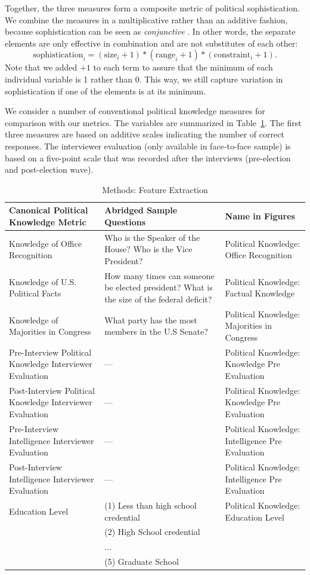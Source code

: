 \documentclass[12pt]{article}
\begin{document}
Together, the three measures form a composite metric of political sophistication. We combine the measures in a multiplicative rather than an additive fashion, because sophistication can be seen as \textit{conjunctive} \citep[see][]{luskin1987measuring}. In other words, the separate elements are only effective in combination and are not substitutes of each other:
\begin{equation}
\text{sophistication}_i = (\text{size}_i + 1) * (\text{range}_i + 1) * (\text{constraint}_i + 1).
\end{equation}
Note that we added $+1$ to each term to assure that the minimum of each individual variable is 1 rather than 0. This way, we still capture variation in sophistication if one of the elements is at its minimum.

We consider a number of conventional political knowledge measures for comparison with our metrics. The variables are summarized in Table~\ref{tab:featextr}. The first three measures are based on additive scales indicating the number of correct responses. The interviewer evaluation (only available in face-to-face sample) is based on a five-point scale that was recorded after the interviews (pre-election and post-election wave).

\begin{table}[h]\onehalfspacing\footnotesize
\begin{tabular}{p{5.5cm}p{5.5cm}p{5.5cm}}
\hline
Canonical Political Knowledge Metric &	Abridged Sample Questions &	Name in Figures \\
\hline
Knowledge of Office Recognition  	  & Who is the Speaker of the House? Who is the Vice President? &  Political Knowledge: Office Recognition \\ 
Knowledge of U.S. Political Facts 	 & How many times can someone be elected president? What is the size of the federal deficit? & Political Knowledge: Factual Knowledge\\
Knowledge of Majorities in Congress & What party has the most members in the U.S Senate? & Political Knowledge: Majorities in Congress\\
Pre-Interview Political Knowledge Interviewer Evaluation & --- & Political Knowledge: Knowledge Pre Evaluation\\
Post-Interview Political Knowledge Interviewer Evaluation & --- & Political Knowledge: Knowledge Pre Evaluation\\
Pre-Interview Intelligence Interviewer Evaluation & --- & Political Knowledge: Intelligence Pre Evaluation\\
Post-Interview Intelligence Interviewer Evaluation & --- & Political Knowledge: Intelligence Pre Evaluation\\
Education Level 	 & (1) Less than high school credential&Political Knowledge: Education Level \\
&(2) High School credential&\\
&...&\\
&(5) Graduate School & \\
\hline 
\end{tabular} 
\caption{Methods: Feature Extraction}\label{tab:featextr}
\end{table}
\end{document}
